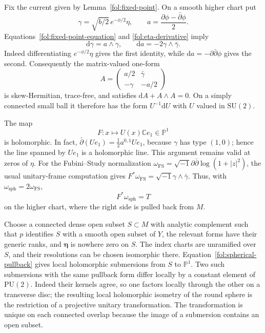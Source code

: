 \documentclass[11pt,letterpaper]{article}
\newcommand{\C}{\mathbb{C}}
\newcommand{\PP}{\mathbb{P}}
\newcommand{\dd}{\mathrm{d}}
\newcommand{\ii}{\sqrt{-1}}
\theoremstyle{definition}
\theoremstyle{remark}
\begin{document}
Fix the current given by Lemma~\ref{fol:fixed-point}.  On a smooth higher
chart put
\begin{equation}\label{fol:unitary-forms}
 \gamma=\sqrt{b/2}\,e^{-\phi/2}\eta,\qquad
 a=\frac{\partial\phi-\bar\partial\phi}{2}.
\end{equation}
Equations~\eqref{fol:fixed-point-equation} and
\eqref{fol:eta-derivative} imply
\begin{equation}\label{fol:structure-equations}
 \dd\gamma=a\wedge\gamma,\qquad
 \dd a=-2\gamma\wedge\bar\gamma.
\end{equation}
Indeed differentiating $e^{-\phi/2}\eta$ gives the first identity, while
$\dd a=-\partial\bar\partial\phi$ gives the second.  Consequently the
matrix-valued one-form
\begin{equation}\label{fol:flat-matrix}
 A=
 \begin{pmatrix}
  a/2 & \bar\gamma\\
  -\gamma & -a/2
 \end{pmatrix}
\end{equation}
is skew-Hermitian, trace-free, and satisfies
$\dd A+A\wedge A=0$.  On a simply connected small ball it therefore
has the form $U^{-1}\dd U$ with $U$ valued in $\mathrm{SU}(2)$.

The map
\[
 F\colon x\longmapsto U(x)\C e_1\in\PP^1
\]
is holomorphic.  In fact,
$\bar\partial(Ue_1)=\tfrac12a^{0,1}Ue_1$, because $\gamma$ has type
$(1,0)$; hence the line spanned by $Ue_1$ is a holomorphic line.
This argument remains valid at zeros of $\eta$.
For the Fubini--Study normalization
$\omega_{\mathrm{FS}}=\ii\partial\bar\partial\log(1+|z|^2)$,
the usual unitary-frame computation gives
$F^*\omega_{\mathrm{FS}}=\ii\gamma\wedge\bar\gamma$.
Thus, with $\omega_{\mathrm{sph}}=2\omega_{\mathrm{FS}}$,
\begin{equation}\label{fol:spherical-pullback}
 F^*\omega_{\mathrm{sph}}=T
\end{equation}
on the higher chart, where the right side is pulled back from $M$.

Choose a connected dense open subset $S\subset M$ with analytic
complement such that $p$ identifies $S$ with a smooth open subset of
$Y$, the relevant forms have their generic ranks, and
$\boldsymbol\eta$ is nowhere zero on $S$.  The index charts are
unramified over $S$, and their resolutions can be chosen isomorphic
there.  Equation~\eqref{fol:spherical-pullback} gives local holomorphic
submersions from $S$ to $\PP^1$.  Two such submersions with the same
pullback form differ locally by a constant element of
$\mathrm{PU}(2)$.  Indeed their kernels agree, so one factors locally
through the other on a transverse disc; the resulting local holomorphic
isometry of the round sphere is the restriction of a projective unitary
transformation.  The transformation is unique on each connected
overlap because the image of a submersion contains an open subset.
\end{document}
